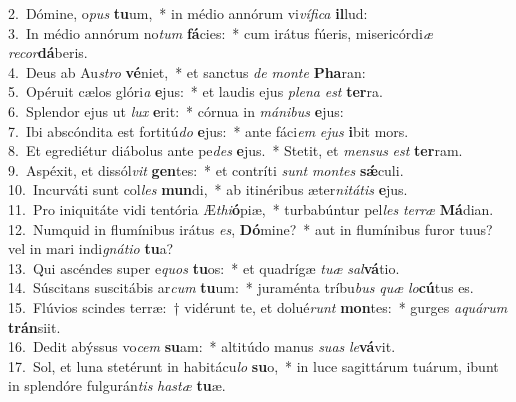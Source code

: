 {2.~}Dómine, o\textit{pus} \textbf{tu}um,~* in médio annórum vi\textit{ví}\textit{fi}\textit{ca} \textbf{il}lud:\\
{3.~}In médio annórum no\textit{tum} \textbf{fá}cies:~* cum irátus fúeris, misericórdi\textit{æ} \textit{re}\textit{cor}\textbf{dá}beris.\\
{4.~}Deus ab Au\textit{stro} \textbf{vé}niet,~* et sanctus \textit{de} \textit{mon}\textit{te} \textbf{Pha}ran:\\
{5.~}Opéruit cælos glóri\textit{a} \textbf{e}jus:~* et laudis ejus \textit{ple}\textit{na} \textit{est} \textbf{ter}ra.\\
{6.~}Splendor ejus ut \textit{lux} \textbf{e}rit:~* córnua in \textit{má}\textit{ni}\textit{bus} \textbf{e}jus:\\
{7.~}Ibi abscóndita est fortitú\textit{do} \textbf{e}jus:~* ante fáci\textit{em} \textit{e}\textit{jus} \textbf{i}bit mors.\\
{8.~}Et egrediétur diábolus ante pe\textit{des} \textbf{e}jus.~* Stetit, et \textit{men}\textit{sus} \textit{est} \textbf{ter}ram.\\
{9.~}Aspéxit, et dissól\textit{vit} \textbf{gen}tes:~* et contríti \textit{sunt} \textit{mon}\textit{tes} \textbf{sǽ}culi.\\
{10.~}Incurváti sunt col\textit{les} \textbf{mun}di,~* ab itinéribus æter\textit{ni}\textit{tá}\textit{tis} \textbf{e}jus.\\
{11.~}Pro iniquitáte vidi tentória Æ\textit{thi}\textbf{ó}piæ,~* turbabúntur pel\textit{les} \textit{ter}\textit{ræ} \textbf{Má}dian.\\
{12.~}Numquid in flumínibus irátus \textit{es}, \textbf{Dó}mine?~* aut in flumínibus furor tuus? vel in mari indi\textit{gná}\textit{ti}\textit{o} \textbf{tu}a?\\
{13.~}Qui ascéndes super e\textit{quos} \textbf{tu}os:~* et quadrígæ \textit{tu}\textit{æ} \textit{sal}\textbf{vá}tio.\\
{14.~}Súscitans suscitábis ar\textit{cum} \textbf{tu}um:~* juraménta tríbu\textit{bus} \textit{quæ} \textit{lo}\textbf{cú}tus es.\\
{15.~}Flúvios scindes terræ:~† vidérunt te, et dolué\textit{runt} \textbf{mon}tes:~* gurges \textit{a}\textit{quá}\textit{rum} \textbf{trán}siit.\\
{16.~}Dedit abýssus vo\textit{cem} \textbf{su}am:~* altitúdo manus \textit{su}\textit{as} \textit{le}\textbf{vá}vit.\\
{17.~}Sol, et luna stetérunt in habitácu\textit{lo} \textbf{su}o,~* in luce sagittárum tuárum, ibunt in splendóre fulgurán\textit{tis} \textit{ha}\textit{stæ} \textbf{tu}æ.\\
